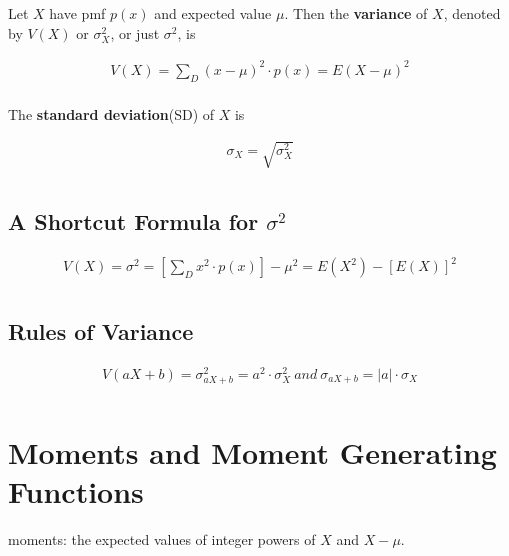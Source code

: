 \begin{definition}
    Let $X$ have pmf $p(x)$ and expected value $\mu$. Then the \textbf{variance} of $X$, denoted by $V(X)$ or $\sigma_X^2$, or just $\sigma^2$, is

    \begin{align*}
        V(X) = \sum\limits_D (x-\mu) ^ 2 \cdot p(x) = E(X- \mu) ^ 2\\
    \end{align*}

    The \textbf{standard deviation}(SD) of $X$ is

    \begin{align*}
        \sigma_X = \sqrt{\sigma_X ^ 2}\\
    \end{align*}
\end{definition}

\subsection{A Shortcut Formula for $\sigma^2$}

\begin{proposition}
    \begin{align*}
        V(X) = \sigma^2 = \left[\sum\limits_D x^2\cdot p(x)\right] - \mu ^ 2 = E(X^2) - \left[E(X)\right] ^ 2\\
    \end{align*}
\end{proposition}

\subsection{Rules of Variance}

\begin{proposition}
    \begin{align*}
        V(aX + b) = \sigma_{aX+b} ^ 2 = a ^ 2 \cdot \sigma_X ^ 2\ and\ \sigma_{aX+b}=|a|\cdot\sigma_X\\
    \end{align*}
\end{proposition}

\section{Moments and Moment Generating Functions}

\begin{definition}
    moments: the expected values of integer powers of $X$ and $X-\mu$.
\end{definition}

